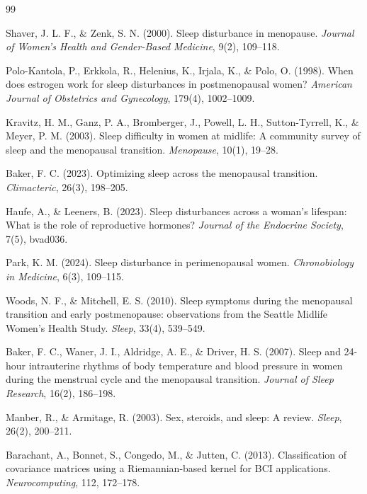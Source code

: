 \documentclass[a4paper,fleqn]{cas-dc}
\begin{document}
\begin{thebibliography}{99}

 Shaver, J. L. F., \& Zenk, S. N. (2000). Sleep disturbance in menopause. \textit{Journal of Women's Health and Gender-Based Medicine}, 9(2), 109--118.

 Polo-Kantola, P., Erkkola, R., Helenius, K., Irjala, K., \& Polo, O. (1998). When does estrogen work for sleep disturbances in postmenopausal women? \textit{American Journal of Obstetrics and Gynecology}, 179(4), 1002--1009.

 Kravitz, H. M., Ganz, P. A., Bromberger, J., Powell, L. H., Sutton-Tyrrell, K., \& Meyer, P. M. (2003). Sleep difficulty in women at midlife: A community survey of sleep and the menopausal transition. \textit{Menopause}, 10(1), 19--28.

 Baker, F. C. (2023). Optimizing sleep across the menopausal transition. \textit{Climacteric}, 26(3), 198--205.

 Haufe, A., \& Leeners, B. (2023). Sleep disturbances across a woman's lifespan: What is the role of reproductive hormones? \textit{Journal of the Endocrine Society}, 7(5), bvad036.

 Park, K. M. (2024). Sleep disturbance in perimenopausal women. \textit{Chronobiology in Medicine}, 6(3), 109--115.

 Woods, N. F., \& Mitchell, E. S. (2010). Sleep symptoms during the menopausal transition and early postmenopause: observations from the Seattle Midlife Women's Health Study. \textit{Sleep}, 33(4), 539--549.

 Baker, F. C., Waner, J. I., Aldridge, A. E., \& Driver, H. S. (2007). Sleep and 24-hour intrauterine rhythms of body temperature and blood pressure in women during the menstrual cycle and the menopausal transition. \textit{Journal of Sleep Research}, 16(2), 186--198.

 Manber, R., \& Armitage, R. (2003). Sex, steroids, and sleep: A review. \textit{Sleep}, 26(2), 200--211.

 Barachant, A., Bonnet, S., Congedo, M., \& Jutten, C. (2013). Classification of covariance matrices using a Riemannian-based kernel for BCI applications. \textit{Neurocomputing}, 112, 172--178.


\end{thebibliography}
\end{document}
